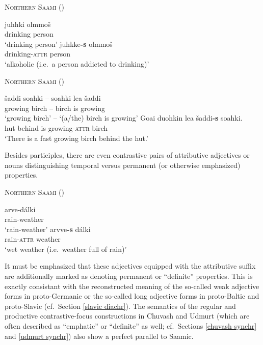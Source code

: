 {\begin{exe}
\ex
\begin{xlist}
\ex \textsc{Northern Saami} (\citealt[204]{nielsen1945b})
\begin{xlist}
\ex
\gll 	juhhki olmmoš\\
	drinking person\\
\glt	 ‘drinking person’
\ex	
\gll	juhkke\textbf{-s} olmmoš\\
	drinking-\textsc{attr} person\\
\glt	‘alkoholic (i.e.~a person addicted to drinking)’
\end{xlist}
\ex \textsc{Northern Saami} (\citealt[282]{bartens1989})
\begin{xlist}
\ex 	
\gll	šaddi soahki – soahki lea šaddi\\
 	growing birch – birch is growing\\
\glt	‘growing birch’ – ‘(a/the) birch is growing’
\ex
\gll	Goa{\dj}i duohkin lea šaddi\textbf{-s} soahki.\\
	hut behind is growing-\textsc{attr} birch\\
\glt	‘There is a fast growing birch behind the hut.’
\end{xlist}
\end{xlist}
\end{exe}
Besides participles, there are even contrastive pairs of attributive adjectives or nouns distinguishing temporal versus permanent (or otherwise emphasized) properties.

\begin{exe}
\ex
\begin{xlist}
\ex \textsc{Northern Saami} (\citealt[48]{bergsland1976})
\begin{xlist}
\ex
\gll	arve-dálki\\
	rain-weather\\
\glt	‘rain-weather’
\ex
\gll	arvve\textbf{-s} dálki\\
	rain-\textsc{attr} weather\\
\glt	‘wet weather (i.e.~weather full of rain)’
\end{xlist}
\end{xlist}
\end{exe}
It must be emphasized that these adjectives equipped with the attributive suffix are additionally marked as denoting permanent or “definite” properties. This is exactly consistant with the reconstructed meaning of the so-called weak adjective forms in proto-Germanic or the so-called long adjective forms in proto-Baltic and proto-Slavic (cf.~Section \ref{slavic diachr}). The semantics of the regular and productive contrastive-focus constructions in Chuvash and Udmurt (which are often described as “emphatic” or “definite” as well; cf.~Sections \ref{chuvash synchr} and \ref{udmurt synchr}) also show a perfect parallel to Saamic. 

}
